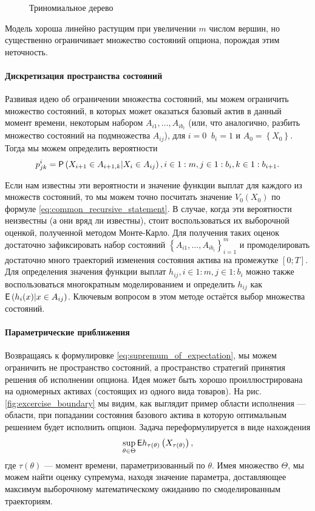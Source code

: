 \begin{figure}
\centering

\caption{Триномиальное дерево}
\label{fig:trinomial_tree}
\end{figure}

Модель хороша линейно растущим при увеличении $m$ числом вершин, но существенно ограничивает множество состояний опциона, порождая этим неточность.

\paragraph{Дискретизация пространства состояний}
Развивая идею об ограничении множества состояний, мы можем ограничить множество состояний, в которых может оказаться базовый актив в данный момент времени, некоторым набором $A_{i1}, \ldots, A_{ib_i}$ (или, что аналогично, разбить множество состояний на подмножества $A_{ij}$), для $i=0 \;\;b_i = 1$ и $A_0 = \left\lbrace X_0\right\rbrace$. Тогда мы можем определить вероятности $$p^i_{jk} = \mathsf{P}\left(X_{i+1}\in A_{i+1, k} \middle\vert X_i\in A_{ij}\right), i\in 1:m, j\in 1:b_i, k\in 1:b_{i+1}.$$

Если нам известны эти вероятности и значение функции выплат для каждого из множеств состояний, то мы можем точно посчитать значение $V_0\left(X_0\right)$ по формуле \eqref{eq:common_recursive_statement}. В случае, когда эти вероятности неизвестны (а они вряд ли известны), стоит воспользоваться их выборочной оценкой, полученной методом Монте-Карло. Для получения таких оценок достаточно зафиксировать набор состояний $\left\lbrace A_{i1}, \ldots, A_{ib_i}\right\rbrace_{i=1}^m$ и промоделировать достаточно много траекторий изменения состояния актива на промежутке $\left[0;T\right]$. Для определения значения функции выплат $h_{ij}, i \in 1:m, j\in 1:b_i$ можно также воспользоваться многократным моделированием и определить $h_{ij}$ как $\mathsf{E}\left( h_i(x)\middle\vert x\in A_{ij}\right)$. Ключевым вопросом в этом методе остаётся выбор множества состояний.

\paragraph{Параметрические приближения}
Возвращаясь к формулировке \eqref{eq:supremum_of_expectation}, мы можем ограничить не пространство состояний, а пространство стратегий принятия решения об исполнении опциона. Идея может быть хорошо проиллюстрирована на одномерных активах (состоящих из одного вида товаров). На рис. \ref{fig:excercise_boundary} мы видим, как выглядит пример области исполнения --- области, при попадании состояния базового актива в которую оптимальным решением будет исполнить опцион. Задача переформулируется в виде нахождения
$$\sup_{\theta \in \Theta} \mathsf{E} h_{\tau(\theta)}\left(X_{\tau\left(\theta\right)}\right),$$ 
где $\tau\left(\theta\right)$ --- момент времени, параметризованный по $\theta$. Имея множество $\Theta$, мы можем найти оценку супремума, находя значение параметра, доставляющее максимум выборочному математическому ожиданию по смоделированным траекториям.

